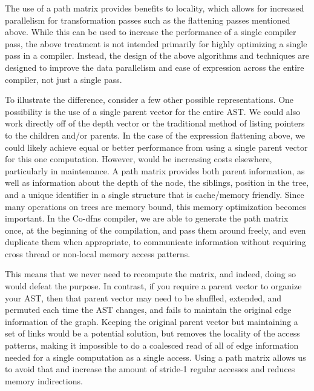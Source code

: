 ﻿\documentclass[numbers,10pt,preprint]{sigplanconf}
\begin{document}
The use of a path matrix provides benefits to locality, which allows for increased parallelism for transformation passes such as the flattening passes mentioned above. While this can be used to increase the performance of a single compiler pass, the above treatment is not intended primarily for highly optimizing a single pass in a compiler. Instead, the design of the above algorithms and techniques are designed to improve the data parallelism and ease of expression across the entire compiler, not just a single pass. 

To illustrate the difference, consider a few other possible representations. One possibility is the use of a single parent vector for the entire AST. We could also work directly off of the depth vector or the traditional method of listing pointers to the children and/or parents. In the case of the expression flattening above, we could likely achieve equal or better performance from using a single parent vector for this one computation. However, would be increasing costs elsewhere, particularly in maintenance. A path matrix provides both parent information, as well as information about the depth of the node, the siblings, position in the tree, and a unique identifier in a single structure that is cache/memory friendly. Since many operations on trees are memory bound, this memory optimization becomes important. In the Co-dfns compiler, we are able to generate the path matrix once, at the beginning of the compilation, and pass them around freely, and even duplicate them when appropriate, to communicate information without requiring cross thread or non-local memory access patterns.

This means that we never need to recompute the matrix, and indeed, doing so would defeat the purpose. In contrast, if you require a parent vector to organize your AST, then that parent vector may need to be shuffled, extended, and permuted each time the AST changes, and fails to maintain the original edge information of the graph. Keeping the original parent vector but maintaining a set of links would be a potential solution, but removes the locality of the access patterns, making it impossible to do a coalesced read of all of edge information needed for a single computation as a single access. Using a path matrix allows us to avoid that and increase the amount of stride-1 regular accesses and reduces memory indirections.
\end{document}
